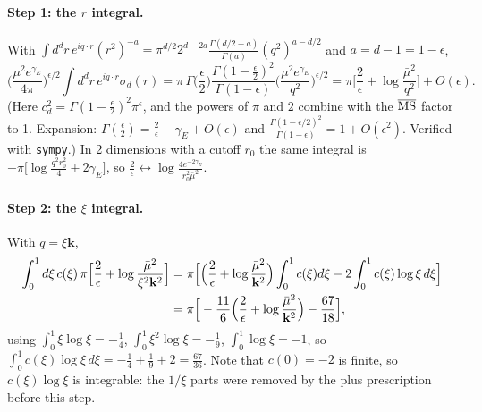 \documentclass[10pt]{article}
\numberwithin{equation}{section}
\newcommand{\mub}{\bar\mu}
\newcommand{\ve}{\epsilon}
\begin{document}
\paragraph{Step 1: the $r$ integral.} With $\int d^dr\,e^{iq\cdot r}(r^2)^{-a}=\pi^{d/2}2^{d-2a}\frac{\Gamma(d/2-a)}{\Gamma(a)}(q^2)^{a-d/2}$ and $a=d-1=1-\ve$,
\begin{equation}
\Big(\frac{\mu^2e^{\gamma_E}}{4\pi}\Big)^{\ve/2}\int d^dr\,e^{iq\cdot r}\sigma_d(r)
=\pi\,\Gamma\Big(\frac\ve2\Big)\frac{\Gamma(1-\frac\ve2)^2}{\Gamma(1-\ve)}\Big(\frac{\mu^2e^{\gamma_E}}{q^2}\Big)^{\ve/2}
=\pi\Big[\frac2\ve+\log\frac{\mub^2}{q^2}\Big]+O(\ve).
\label{eq:Iphase}
\end{equation}
(Here $c_d^2=\Gamma(1-\frac\ve2)^2\pi^{\ve}$, and the powers of $\pi$ and $2$ combine with the $\overline{\rm MS}$ factor to 1. Expansion: $\Gamma(\frac\ve2)=\frac2\ve-\gamma_E+O(\ve)$ and $\frac{\Gamma(1-\ve/2)^2}{\Gamma(1-\ve)}=1+O(\ve^2)$. Verified with \texttt{sympy}.) In 2 dimensions with a cutoff $r_0$ the same integral is $-\pi\big[\log\frac{q^2r_0^2}{4}+2\gamma_E\big]$, so $\frac2\ve\leftrightarrow\log\frac{4e^{-2\gamma_E}}{r_0^2\mub^2}$.
\paragraph{Step 2: the $\xi$ integral.} With $q=\xi\mathbf k$,
\begin{align}
\int_0^1d\xi\,c(\xi)\,\pi\Big[\frac2\ve+\log\frac{\mub^2}{\xi^2\mathbf k^2}\Big]
&=\pi\Big[\Big(\frac2\ve+\log\frac{\mub^2}{\mathbf k^2}\Big)\int_0^1c(\xi)d\xi-2\int_0^1c(\xi)\log\xi\,d\xi\Big]\notag\\
&=\pi\Big[-\frac{11}{6}\Big(\frac2\ve+\log\frac{\mub^2}{\mathbf k^2}\Big)-\frac{67}{18}\Big],
\label{eq:xiint}
\end{align}
using $\int_0^1\xi\log\xi=-\frac14$, $\int_0^1\xi^2\log\xi=-\frac19$, $\int_0^1\log\xi=-1$, so $\int_0^1c(\xi)\log\xi\,d\xi=-\frac14+\frac19+2=\frac{67}{36}$. Note that $c(0)=-2$ is finite, so $c(\xi)\log\xi$ is integrable: the $1/\xi$ parts were removed by the plus prescription before this step.
\end{document}
